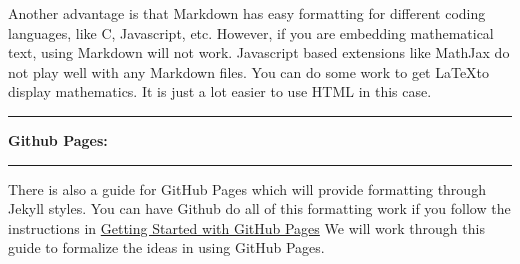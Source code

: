\documentclass[10pt,fleqn]{article}
\begin{document}
Another advantage is that Markdown has easy formatting for different coding
languages, like C, Javascript, etc. However, if you are embedding mathematical
text, using Markdown will
not work. Javascript based extensions like MathJax do not play well with any
Markdown files. You can do some work to get \LaTeX to display mathematics. It
is just a lot easier to use HTML in this case.
\vskip0.1in\hrule\vskip0.1in \noindent
{\bf Github Pages:}
\vskip0.1in\hrule\vskip0.1in \noindent
There is also a guide for GitHub Pages which will provide formatting through
Jekyll styles. You can have Github do all of this formatting work if you follow
the instructions in \href{https://guides.github.com/features/pages/}
{Getting Started with GitHub Pages} We will work through this guide to formalize
the ideas in using GitHub Pages.
\end{document}
